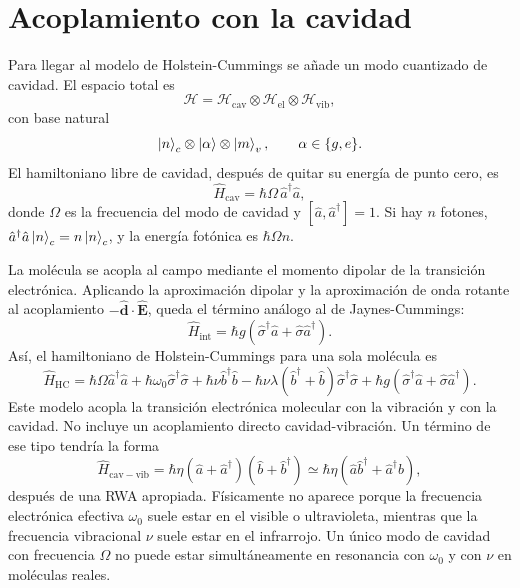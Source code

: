\documentclass[11pt]{article}
\newcommand{\adag}{\hat a^\dagger}
\newcommand{\bdag}{\hat b^\dagger}
\newcommand{\sigmad}{\hat\sigma^\dagger}
\begin{document}
\section{Acoplamiento con la cavidad}

Para llegar al modelo de Holstein-Cummings se a\~nade un modo cuantizado de
cavidad. El espacio total es
\begin{equation}
  \mathcal H
  =
  \mathcal H_{\mathrm{cav}}
  \otimes
  \mathcal H_{\mathrm{el}}
  \otimes
  \mathcal H_{\mathrm{vib}},
\end{equation}
con base natural
\begin{equation}
  \ket{n}_c\otimes\ket{\alpha}\otimes\ket{m}_v,
  \qquad
  \alpha\in\{g,e\}.
\end{equation}
El hamiltoniano libre de cavidad, despu\'es de quitar su energ\'ia de punto
cero, es
\begin{equation}
  \hat H_{\mathrm{cav}}=\hbar\Omega\,\adag\hat a,
\end{equation}
donde $\Omega$ es la frecuencia del modo de cavidad y
$[\hat a,\adag]=1$. Si hay $n$ fotones,
$\adag\hat a\ket{n}_c=n\ket{n}_c$, y la energ\'ia fot\'onica es
$\hbar\Omega n$.

La mol\'ecula se acopla al campo mediante el momento dipolar de la transici\'on
electr\'onica. Aplicando la aproximaci\'on dipolar y la aproximaci\'on de onda
rotante al acoplamiento $-\hat{\mathbf d}\cdot\hat{\mathbf E}$, queda el
t\'ermino an\'alogo al de Jaynes-Cummings:
\begin{equation}
  \hat H_{\mathrm{int}}
  =
  \hbar g\left(\sigmad\hat a+\hat\sigma\adag\right).
\end{equation}
As\'i, el hamiltoniano de Holstein-Cummings para una sola mol\'ecula es
\begin{equation}
  \boxed{
  \hat H_{\mathrm{HC}}
  =
  \hbar\Omega\adag\hat a
  +
  \hbar\omega_0\sigmad\hat\sigma
  +
  \hbar\nu\bdag\hat b
  -
  \hbar\nu\lambda(\bdag+\hat b)\sigmad\hat\sigma
  +
  \hbar g\left(\sigmad\hat a+\hat\sigma\adag\right).
  }
\end{equation}
Este modelo acopla la transici\'on electr\'onica molecular con la vibraci\'on
y con la cavidad. No incluye un acoplamiento directo cavidad-vibraci\'on. Un
t\'ermino de ese tipo tendr\'ia la forma
\begin{equation}
  \hat H_{\mathrm{cav-vib}}
  =
  \hbar\eta(\hat a+\adag)(\hat b+\bdag)
  \simeq
  \hbar\eta(\hat a\bdag+\adag\hat b),
\end{equation}
despu\'es de una RWA apropiada. F\'isicamente no aparece porque la frecuencia
electr\'onica efectiva $\omega_0$ suele estar en el visible o ultravioleta,
mientras que la frecuencia vibracional $\nu$ suele estar en el infrarrojo. Un
\'unico modo de cavidad con frecuencia $\Omega$ no puede estar
simult\'aneamente en resonancia con $\omega_0$ y con $\nu$ en mol\'eculas
reales.
\end{document}

